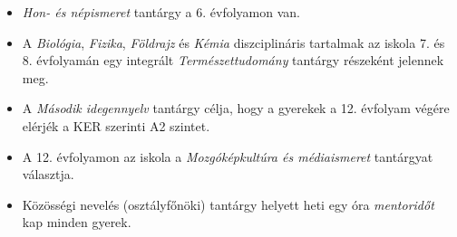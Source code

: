 
\newpage

\begin{itemize}
\tightlist
\item
  \emph{Hon- és népismeret} tantárgy a 6. évfolyamon van.
\item
  A \emph{Biológia}, \emph{Fizika}, \emph{Földrajz} és \emph{Kémia}
  diszciplináris tartalmak az iskola 7. és 8. évfolyamán egy integrált
  \emph{Természettudomány} tantárgy részeként jelennek meg.
\item
  A \emph{Második idegennyelv} tantárgy célja, hogy a gyerekek a 12.
  évfolyam végére elérjék a KER szerinti A2 szintet.
\item
  A 12. évfolyamon az iskola a \emph{Mozgóképkultúra és médiaismeret}
  tantárgyat választja.
\item
  Közösségi nevelés (osztályfőnöki) tantárgy helyett heti egy óra
  \emph{mentoridőt} kap minden gyerek.
\end{itemize}

